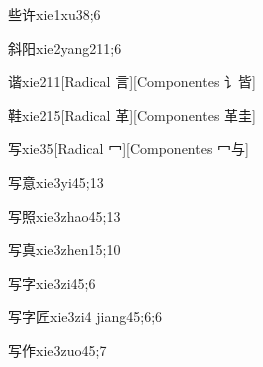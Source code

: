 \begin{verbete}{些许}{xie1xu3}{8;6}
\end{verbete}

\begin{verbete}{斜阳}{xie2yang2}{11;6}
\end{verbete}

\begin{verbete}{谐}{xie2}{11}[Radical 言][Componentes 讠皆]
\end{verbete}

\begin{verbete}{鞋}{xie2}{15}[Radical 革][Componentes 革圭]
\end{verbete}

\begin{verbete}{写}{xie3}{5}[Radical 冖][Componentes 冖与]
\end{verbete}

\begin{verbete}{写意}{xie3yi4}{5;13}
\end{verbete}

\begin{verbete}{写照}{xie3zhao4}{5;13}
\end{verbete}

\begin{verbete}{写真}{xie3zhen1}{5;10}
\end{verbete}

\begin{verbete}{写字}{xie3zi4}{5;6}
\end{verbete}

\begin{verbete}{写字匠}{xie3zi4 jiang4}{5;6;6}
\end{verbete}

\begin{verbete}{写作}{xie3zuo4}{5;7}
\end{verbete}

